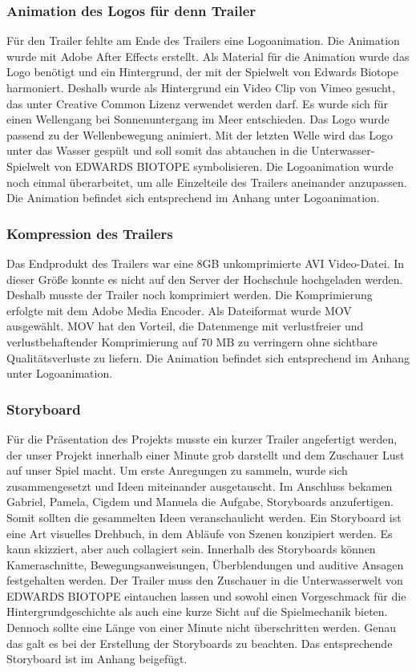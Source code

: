 \subsubsection{Animation des Logos für denn Trailer}
Für den Trailer fehlte am Ende des Trailers eine Logoanimation. Die Animation wurde mit Adobe After Effects erstellt. Als Material für die Animation wurde das Logo benötigt und ein Hintergrund, der mit der Spielwelt von Edwards Biotope harmoniert. Deshalb wurde als Hintergrund ein Video Clip von Vimeo gesucht, das unter Creative Common Lizenz verwendet werden darf. Es wurde sich für einen Wellengang bei Sonnenuntergang im Meer entschieden. Das Logo wurde passend zu der Wellenbewegung animiert. Mit der letzten Welle wird das Logo unter das Wasser gespült und soll somit das abtauchen in die Unterwasser-Spielwelt von EDWARDS BIOTOPE symbolisieren. Die Logoanimation wurde noch einmal überarbeitet, um alle Einzelteile des Trailers aneinander anzupassen. 
Die Animation befindet sich entsprechend im Anhang unter Logoanimation.

\subsubsection{Kompression des Trailers}
Das Endprodukt des Trailers war eine 8GB unkomprimierte AVI Video-Datei. In dieser Größe konnte es nicht auf den Server der Hochschule hochgeladen werden. Deshalb musste der Trailer noch komprimiert werden. Die Komprimierung erfolgte mit dem Adobe Media Encoder. Als Dateiformat wurde MOV ausgewählt. MOV hat den Vorteil, die Datenmenge mit verlustfreier und verlustbehaftender Komprimierung auf 70 MB zu verringern ohne sichtbare Qualitätsverluste zu liefern.
Die Animation befindet sich entsprechend im Anhang unter Logoanimation.


\subsubsection{Storyboard}
Für die Präsentation des Projekts musste ein kurzer Trailer angefertigt werden, der unser Projekt innerhalb einer Minute grob darstellt und dem Zuschauer Lust auf unser Spiel macht. Um erste Anregungen zu sammeln, wurde sich zusammengesetzt und Ideen miteinander ausgetauscht. Im Anschluss bekamen Gabriel, Pamela, Cigdem und Manuela die Aufgabe, Storyboards anzufertigen. Somit sollten die gesammelten Ideen veranschaulicht werden.
Ein Storyboard ist eine Art visuelles Drehbuch, in dem Abläufe von Szenen konzipiert werden. Es kann skizziert, aber auch collagiert sein. Innerhalb des Storyboards können Kameraschnitte, Bewegungsanweisungen, Überblendungen und auditive Ansagen festgehalten werden.
Der Trailer muss den Zuschauer in die Unterwasserwelt von EDWARDS BIOTOPE eintauchen lassen und sowohl einen Vorgeschmack für die Hintergrundgeschichte als auch eine kurze Sicht auf die Spielmechanik bieten. Dennoch sollte eine Länge von einer Minute nicht überschritten werden. Genau das galt es bei der Erstellung der Storyboards zu beachten. Das entsprechende Storyboard ist im Anhang beigefügt. 

